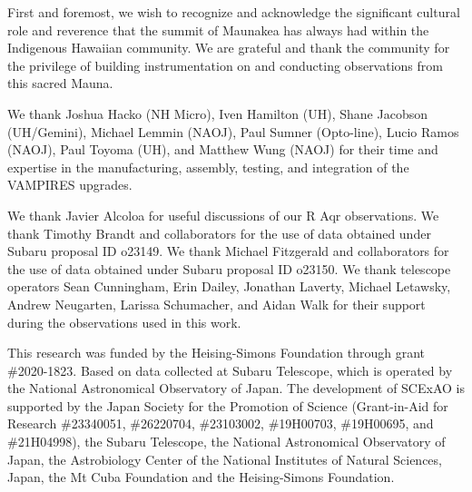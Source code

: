 \begin{acknowledgements}

First and foremost, we wish to recognize and acknowledge the significant cultural role and reverence that the summit of Maunakea has always had within the Indigenous Hawaiian community. We are grateful and thank the community for the privilege of building instrumentation on and conducting observations from this sacred Mauna.

We thank Joshua Hacko (NH Micro), Iven Hamilton (UH), Shane Jacobson (UH/Gemini), Michael Lemmin (NAOJ), Paul Sumner (Opto-line), Lucio Ramos (NAOJ), Paul Toyoma (UH), and Matthew Wung (NAOJ) for their time and expertise in the manufacturing, assembly, testing, and integration of the VAMPIRES upgrades.


We thank Javier Alcoloa for useful discussions of our R Aqr observations. We thank Timothy Brandt and collaborators for the use of data obtained under Subaru proposal ID o23149. We thank Michael Fitzgerald and collaborators for the use of data obtained under Subaru proposal ID o23150. We thank telescope operators Sean Cunningham, Erin Dailey, Jonathan Laverty, Michael Letawsky, Andrew Neugarten, Larissa Schumacher, and Aidan Walk for their support during the observations used in this work.

This research was funded by the Heising-Simons Foundation through grant \#2020-1823. Based on data collected at Subaru Telescope, which is operated by the National Astronomical Observatory of Japan. The development of SCExAO is supported by the Japan Society for the Promotion of Science (Grant-in-Aid for Research \#23340051, \#26220704, \#23103002, \#19H00703, \#19H00695, and \#21H04998), the Subaru Telescope, the National Astronomical Observatory of Japan, the Astrobiology Center of the National Institutes of Natural Sciences, Japan, the Mt Cuba Foundation and the Heising-Simons Foundation.
\end{acknowledgements}